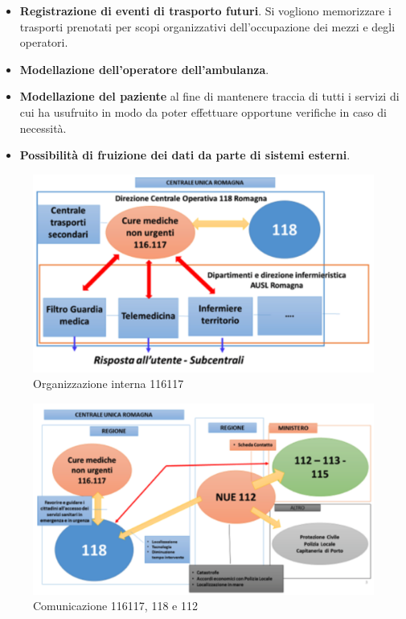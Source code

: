 \documentclass[12pt]{article}
\begin{document}
\begin{itemize}
    \item \textbf{Registrazione di eventi di trasporto futuri}. Si vogliono memorizzare i trasporti prenotati per scopi organizzativi dell'occupazione dei mezzi e degli operatori.
    \item \textbf{Modellazione dell'operatore dell'ambulanza}.
    \item \textbf{Modellazione del paziente} al fine di mantenere traccia di tutti i servizi di cui ha usufruito in modo da poter effettuare opportune verifiche in caso di necessità.
    \item \textbf{Possibilità di fruizione dei dati da parte di sistemi esterni}.
\end{itemize}

 \begin{figure}[!ht]
    \centering
      \includegraphics[width=13cm]{fig/org116117.png}
      \caption{Organizzazione interna 116117}
      \label{org}
    \end{figure}
    
     \begin{figure}[!ht]
    \centerline{\includegraphics[width=13cm]{fig/comunicazione116117.png}}
      \caption{Comunicazione 116117, 118 e 112}
      \label{com}
    \end{figure}
\end{document}
